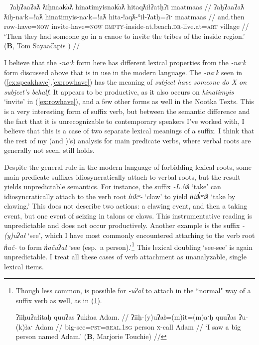 \ex~ \label{ex:rowhave}
\begingl
\glpreamble ʔaḥʔaaʔaƛ ƛiḥnaak̓aƛ hinatimyisnak̓aƛ hitaqƛiłʔatḥʔi maatmaas //
\gla ʔaḥʔaaʔaƛ ƛiḥ-naˑk=!aƛ hinatimyis-naˑk=!aƛ hita-!aqƛ-°ił-ʔatḥ=ʔiˑ maatmaas //
\glb and.then row-have=\textsc{now} invite-have=\textsc{now} \textsc{empty}-inside-at.beach.\textsc{dr}-live.at=\textsc{art} village //
\glft `Then they had someone go in a canoe to invite the tribes of the inside region.' (\textbf{B}, Tom Sayaač̓apis \citealt[297--298]{sapir1955}) //
\endgl
\xe

I believe that the \textit{-naˑk} form here has different lexical properties from the \textit{-naˑk} form discussed above that is in use in the modern language. The \textit{-naˑk} seen in (\ref{ex:speakhave},\ref{ex:rowhave}) has the meaning of \textit{subject have someone do X on subject's behalf}. It appears to be productive, as it also occurs on \textit{hinatimyis} `invite' in (\ref{ex:rowhave}), and a few other forms as well in the Nootka Texts. This is a very interesting form of suffix verb, but between the semantic difference and the fact that it is unrecognizable to contemporary speakers I've worked with, I believe that this is a case of two separate lexical meanings of a suffix. I think that the rest of my (and \citeauthor{wojdak2005})'s) analysis for main predicate verbs, where verbal roots are generally not seen, still holds.

Despite the general rule in the modern language of forbidding lexical roots, some main predicate suffixes idiosyncratically attach to verbal roots, but the result yields unpredictable semantics. For instance, the suffix \textit{-L.!iƛ} `take' can idiosyncratically attach to the verb root \textit{n̓ikʷ-} `claw' to yield \textit{n̓iik̓ʷiƛ} `take by clawing.' This does not describe two actions: a clawing event, and then a taking event, but one event of seizing in talons or claws. This instrumentative reading is unpredictable and does not occur productively. Another example is the suffix \textit{-(y)uʔał} `see', which I have most commonly encountered attaching to the verb root \textit{n̓ač-} to form \textit{n̓ačuʔał} `see (esp.\ a person).'\footnote{Though less common, is possible for \textit{-uʔał} to attach in the ``normal" way of a suffix verb as well, as in (\ref{ex:sawabigman}).

\ex \label{ex:sawabigman}
\begingl
\glpreamble ʔiiḥuʔałitaḥ quuʔas ʔukłaa Adam. //
\gla ʔiiḥ-(y)uʔał=(m)it=(m)aˑḥ quuʔas ʔu-(k)łaˑ Adam //
\glb big-see=\textsc{pst}=\textsc{real.1sg} person \textsc{x}-call Adam //
\glft `I saw a big person named Adam.' (\textbf{B}, Marjorie Touchie) //
\endgl
\xe
} This lexical doubling `see-see' is again unpredictable. I treat all these cases of verb attachment as unanalyzable, single lexical items.

